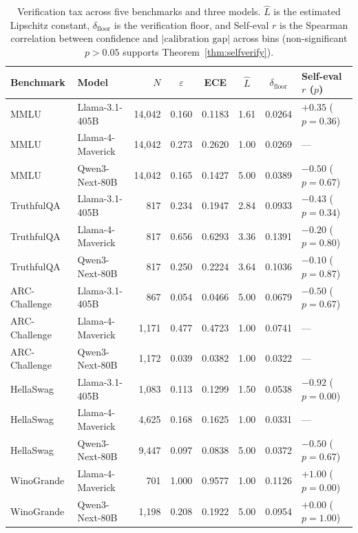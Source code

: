 \begin{table}[t]
\centering
\caption{Verification tax across five benchmarks and three models. $\hat{L}$ is the estimated Lipschitz constant, $\delta_{\mathrm{floor}}$ is the verification floor, and Self-eval $r$ is the Spearman correlation between confidence and $|\text{calibration gap}|$ across bins (non-significant $p > 0.05$ supports Theorem~\ref{thm:selfverify}).}
\label{tab:all-benchmarks}
\small
\begin{tabular}{llrccccl}
\toprule
Benchmark & Model & $N$ & $\varepsilon$ & ECE & $\hat{L}$ & $\delta_{\mathrm{floor}}$ & Self-eval $r$ ($p$) \\
\midrule
MMLU & Llama-3.1-405B & 14,042 & 0.160 & 0.1183 & 1.61 & 0.0264 & $+0.35$ ($p=0.36$) \\
MMLU & Llama-4-Maverick & 14,042 & 0.273 & 0.2620 & 1.00 & 0.0269 & --- \\
MMLU & Qwen3-Next-80B & 14,042 & 0.165 & 0.1427 & 5.00 & 0.0389 & $-0.50$ ($p=0.67$) \\
\midrule
TruthfulQA & Llama-3.1-405B & 817 & 0.234 & 0.1947 & 2.84 & 0.0933 & $-0.43$ ($p=0.34$) \\
TruthfulQA & Llama-4-Maverick & 817 & 0.656 & 0.6293 & 3.36 & 0.1391 & $-0.20$ ($p=0.80$) \\
TruthfulQA & Qwen3-Next-80B & 817 & 0.250 & 0.2224 & 3.64 & 0.1036 & $-0.10$ ($p=0.87$) \\
\midrule
ARC-Challenge & Llama-3.1-405B & 867 & 0.054 & 0.0466 & 5.00 & 0.0679 & $-0.50$ ($p=0.67$) \\
ARC-Challenge & Llama-4-Maverick & 1,171 & 0.477 & 0.4723 & 1.00 & 0.0741 & --- \\
ARC-Challenge & Qwen3-Next-80B & 1,172 & 0.039 & 0.0382 & 1.00 & 0.0322 & --- \\
\midrule
HellaSwag & Llama-3.1-405B & 1,083 & 0.113 & 0.1299 & 1.50 & 0.0538 & $-0.92$ ($p=0.00$) \\
HellaSwag & Llama-4-Maverick & 4,625 & 0.168 & 0.1625 & 1.00 & 0.0331 & --- \\
HellaSwag & Qwen3-Next-80B & 9,447 & 0.097 & 0.0838 & 5.00 & 0.0372 & $-0.50$ ($p=0.67$) \\
\midrule
WinoGrande & Llama-4-Maverick & 701 & 1.000 & 0.9577 & 1.00 & 0.1126 & $+1.00$ ($p=0.00$) \\
WinoGrande & Qwen3-Next-80B & 1,198 & 0.208 & 0.1922 & 5.00 & 0.0954 & $+0.00$ ($p=1.00$) \\
\bottomrule
\end{tabular}
\end{table}
